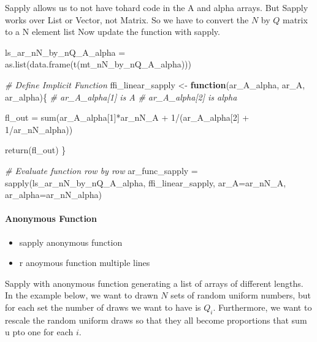 \documentclass[
]{book}
\newenvironment{Shaded}{\begin{snugshade}}{\end{snugshade}}
\newcommand{\AttributeTok}[1]{\textcolor[rgb]{0.77,0.63,0.00}{#1}}
\newcommand{\CommentTok}[1]{\textcolor[rgb]{0.56,0.35,0.01}{\textit{#1}}}
\newcommand{\ControlFlowTok}[1]{\textcolor[rgb]{0.13,0.29,0.53}{\textbf{#1}}}
\newcommand{\DecValTok}[1]{\textcolor[rgb]{0.00,0.00,0.81}{#1}}
\newcommand{\FunctionTok}[1]{\textcolor[rgb]{0.00,0.00,0.00}{#1}}
\newcommand{\NormalTok}[1]{#1}
\newcommand{\OtherTok}[1]{\textcolor[rgb]{0.56,0.35,0.01}{#1}}
\newcommand{\SpecialCharTok}[1]{\textcolor[rgb]{0.00,0.00,0.00}{#1}}
\providecommand{\tightlist}{%
  \setlength{\itemsep}{0pt}\setlength{\parskip}{0pt}}
\begin{document}
Sapply allows us to not have tohard code in the A and alpha arrays. But Sapply works over List or Vector, not Matrix. So we have to convert the \(N\) by \(Q\) matrix to a N element list
Now update the function with sapply.

\begin{Shaded}
\begin{Highlighting}[]
\NormalTok{ls\_ar\_nN\_by\_nQ\_A\_alpha }\OtherTok{=} \FunctionTok{as.list}\NormalTok{(}\FunctionTok{data.frame}\NormalTok{(}\FunctionTok{t}\NormalTok{(mt\_nN\_by\_nQ\_A\_alpha)))}

\CommentTok{\# Define Implicit Function}
\NormalTok{ffi\_linear\_sapply }\OtherTok{\textless{}{-}} \ControlFlowTok{function}\NormalTok{(ar\_A\_alpha, ar\_A, ar\_alpha)\{}
  \CommentTok{\# ar\_A\_alpha[1] is A}
  \CommentTok{\# ar\_A\_alpha[2] is alpha}

\NormalTok{  fl\_out }\OtherTok{=} \FunctionTok{sum}\NormalTok{(ar\_A\_alpha[}\DecValTok{1}\NormalTok{]}\SpecialCharTok{*}\NormalTok{ar\_nN\_A }\SpecialCharTok{+}
                 \DecValTok{1}\SpecialCharTok{/}\NormalTok{(ar\_A\_alpha[}\DecValTok{2}\NormalTok{] }\SpecialCharTok{+} \DecValTok{1}\SpecialCharTok{/}\NormalTok{ar\_nN\_alpha))}

  \FunctionTok{return}\NormalTok{(fl\_out)}
\NormalTok{\}}

\CommentTok{\# Evaluate function row by row}
\NormalTok{ar\_func\_sapply }\OtherTok{=} \FunctionTok{sapply}\NormalTok{(ls\_ar\_nN\_by\_nQ\_A\_alpha, ffi\_linear\_sapply,}
                        \AttributeTok{ar\_A=}\NormalTok{ar\_nN\_A, }\AttributeTok{ar\_alpha=}\NormalTok{ar\_nN\_alpha)}
\end{Highlighting}
\end{Shaded}

\hypertarget{anonymous-function-1}{%
\paragraph{Anonymous Function}\label{anonymous-function-1}}

\begin{itemize}
\tightlist
\item
  sapply anonymous function
\item
  r anoymous function multiple lines
\end{itemize}

Sapply with anonymous function generating a list of arrays of different lengths. In the example below, we want to drawn \(N\) sets of random uniform numbers, but for each set the number of draws we want to have is \(Q_i\). Furthermore, we want to rescale the random uniform draws so that they all become proportions that sum u pto one for each \(i\).
\end{document}
